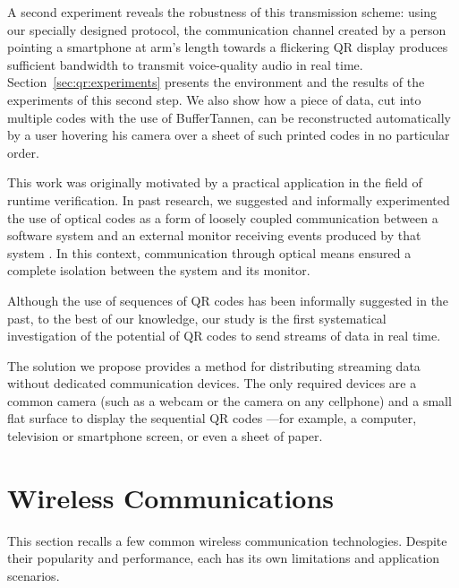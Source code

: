 A second experiment reveals the robustness of this transmission scheme: using our specially designed protocol, the communication channel created by a person pointing a smartphone at arm's length towards a flickering QR display produces sufficient bandwidth to transmit voice-quality audio in real time. Section~\ref{sec:qr:experiments} presents the environment and the results of the experiments of this second step. We also show how a piece of data, cut into multiple codes with the use of BufferTannen, can be reconstructed automatically by a user hovering his camera over a sheet of such printed codes in no particular order.

This work was originally motivated by a practical application in the field of runtime verification. In past research, we suggested and informally experimented the use of optical codes as a form of loosely coupled communication between a software system and an external monitor receiving events produced by that system \cite{DBLP_conf/rv/LavoieLVGH14}. In this context, communication through optical means ensured a complete isolation between the system and its monitor.

Although the use of sequences of QR codes has been informally suggested in the past, to the best of our knowledge, our study is the first systematical investigation of the potential of QR codes to send streams of data in real time. %

The solution we propose provides a method for distributing streaming data without dedicated communication devices. The only required devices are a common camera (such as a webcam or the camera on any cellphone) and a small flat surface to display the sequential QR codes ---for example, a computer, television or smartphone screen, or even a sheet of paper.


\section{Wireless Communications}\label{sec:qr:reading} %

This section recalls a few common wireless communication technologies. Despite their popularity and performance, each has its own limitations and application scenarios. %

